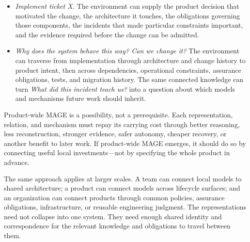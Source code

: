 \begin{itemize}
\tightlist
\item
  \emph{Implement ticket X.} The environment can supply the product decision that motivated the change, the architecture it touches, the obligations governing those components, the incidents that made particular constraints important, and the evidence required before the change can be admitted.
\item
  \emph{Why does the system behave this way? Can we change it?} The environment can traverse from implementation through architecture and change history to product intent, then across dependencies, operational constraints, assurance obligations, tests, and migration history. The same connected knowledge can turn \emph{What did this incident teach us?} into a question about which models and mechanisms future work should inherit.
\end{itemize}

Product-wide MAGE is a possibility, not a prerequisite. Each representation, relation, and mechanism must repay its carrying cost through better reasoning, less reconstruction, stronger evidence, safer autonomy, cheaper recovery, or another benefit to later work. If product-wide MAGE emerges, it should do so by connecting useful local investments---not by specifying the whole product in advance.

The same approach applies at larger scales. A team can connect local models to shared architecture; a product can connect models across lifecycle surfaces; and an organization can connect products through common policies, assurance obligations, infrastructure, or reusable engineering judgment. The representations need not collapse into one system. They need enough shared identity and correspondence for the relevant knowledge and obligations to travel between them.
